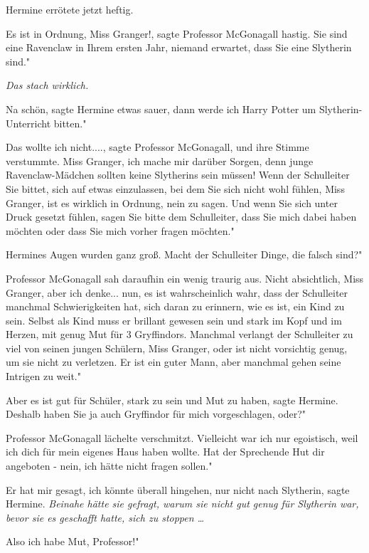 Hermine errötete jetzt heftig.

\glqq Es ist in Ordnung, Miss Granger!\grqq{}, sagte Professor McGonagall
hastig. \glqq Sie sind eine Ravenclaw in Ihrem ersten Jahr, niemand erwartet,
dass Sie eine Slytherin sind."

\emph{Das stach wirklich.}

\glqq Na schön\grqq{}, sagte Hermine etwas sauer, \glqq dann werde ich Harry
Potter um Slytherin-Unterricht bitten."

\glqq Das wollte ich nicht....\grqq{}, sagte Professor McGonagall, und ihre
Stimme verstummte. \glqq Miss Granger, ich mache mir darüber Sorgen, denn junge
Ravenclaw-Mädchen sollten keine Slytherins sein müssen! Wenn der Schulleiter Sie
bittet, sich auf etwas einzulassen, bei dem Sie sich nicht wohl fühlen, Miss
Granger, ist es wirklich in Ordnung, nein zu sagen. Und wenn Sie sich unter
Druck gesetzt fühlen, sagen Sie bitte dem Schulleiter, dass Sie mich dabei haben
möchten oder dass Sie mich vorher fragen möchten."

Hermines Augen wurden ganz groß. \glqq Macht der Schulleiter Dinge, die falsch
sind?"

Professor McGonagall sah daraufhin ein wenig traurig aus. \glqq Nicht
absichtlich, Miss Granger, aber ich denke... nun, es ist wahrscheinlich wahr,
dass der Schulleiter manchmal Schwierigkeiten hat, sich daran zu erinnern, wie
es ist, ein Kind zu sein. Selbst als Kind muss er brillant gewesen sein und
stark im Kopf und im Herzen, mit genug Mut für 3 Gryffindors. Manchmal verlangt
der Schulleiter zu viel von seinen jungen Schülern, Miss Granger, oder ist nicht
vorsichtig genug, um sie nicht zu verletzen. Er ist ein guter Mann, aber
manchmal gehen seine Intrigen zu weit."

\glqq Aber es ist gut für Schüler, stark zu sein und Mut zu haben\grqq{}, sagte
Hermine. \glqq Deshalb haben Sie ja auch Gryffindor für mich vorgeschlagen,
oder?"

Professor McGonagall lächelte verschmitzt. \glqq Vielleicht war ich nur
egoistisch, weil ich dich für mein eigenes Haus haben wollte. Hat der Sprechende
Hut dir angeboten - nein, ich hätte nicht fragen sollen."

\glqq Er hat mir gesagt, ich könnte überall hingehen, nur nicht nach
Slytherin\grqq{}, sagte Hermine.
\emph{Beinahe hätte sie gefragt, warum sie nicht gut genug für Slytherin war,
bevor sie es geschafft hatte, sich zu stoppen …}

\glqq Also ich habe Mut, Professor!"

